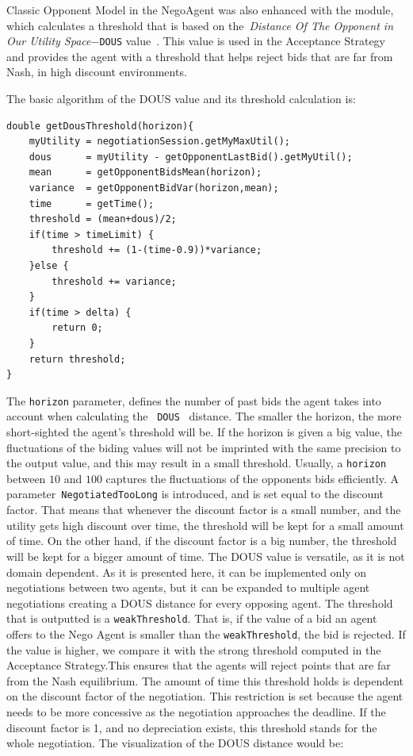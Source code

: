 \documentclass[html]{report}    %
\begin{document}
Classic Opponent Model  in the NegoAgent was also enhanced with the module, which calculates a threshold that is based on the~\textit{Distance Of The Opponent in Our Utility Space}$-$\texttt{DOUS} value~\cite{anac2013}. This value is used in the Acceptance Strategy and provides the agent with a threshold that helps reject bids that are far from Nash, in high discount environments.

The basic algorithm of the DOUS value and its threshold calculation is:

\begin{verbatim}
double getDousThreshold(horizon){
    myUtility = negotiationSession.getMyMaxUtil();
    dous      = myUtility - getOpponentLastBid().getMyUtil();
    mean      = getOpponentBidsMean(horizon);
    variance  = getOpponentBidVar(horizon,mean);
    time      = getTime();
    threshold = (mean+dous)/2;
    if(time > timeLimit) {
        threshold += (1-(time-0.9))*variance;
    }else {
        threshold += variance;
    }
    if(time > delta) {
        return 0;
    }    
    return threshold;
}
\end{verbatim}

The \texttt{horizon} parameter, defines the number of past bids the agent takes into account when calculating the ~\texttt{DOUS}~\cite{anac2013} distance. The smaller the horizon, the more short-sighted the agent's threshold will be. If the horizon is given a big value, the fluctuations of the biding values will not be imprinted with the same precision to the output value, and this may result in a small threshold. Usually, a \texttt{horizon} between $10$ and $100$ captures the fluctuations of the opponents bids efficiently.
A parameter~\texttt{NegotiatedTooLong} is introduced, and is set equal to the discount factor. That means that whenever the discount factor is a small number, and the utility gets high discount over time, the threshold will be kept for a small amount of time. On the other hand, if the discount factor is a big number, the threshold will be kept for a bigger amount of time.
The DOUS value is versatile, as it is not domain dependent.
As it is presented here, it can be implemented only on negotiations between two agents, but it can be expanded to multiple agent negotiations creating a DOUS distance for every opposing agent. The threshold that is outputted is a \texttt{weakThreshold}. That is, if the value of a bid an agent offers to the Nego Agent is smaller than the \texttt{weakThreshold}, the bid is rejected. If the value is higher, we compare it with the strong threshold computed in the Acceptance Strategy.This ensures that the agents will reject points that are far from the Nash equilibrium.
The amount of time this threshold holds is dependent on the discount factor of the negotiation. This restriction is set because the agent needs to be more concessive as the negotiation approaches the deadline. If the discount factor is 1, and no depreciation exists, this threshold stands for the whole negotiation. 
The visualization of the DOUS distance would be:
\end{document}
